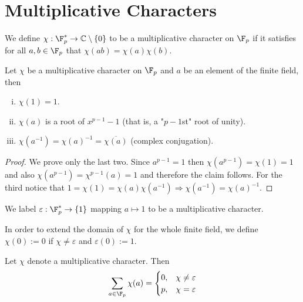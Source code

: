 \section{Multiplicative Characters}

\begin{definition}
   We define \(\chi : \F_p^{\ast} \to \mathbb{C} \setminus \{0\}\) to be a
   multiplicative character on \(\F_p\) if it satisfies for all \(a, b \in
   \F_p\) that \(\chi(ab) = \chi(a)\chi(b)\). 
\end{definition}

\begin{proposition}
   Let \(\chi\) be a multiplicative character on \(\F_p\) and \(a\) be an
   element of the finite field, then 
   \begin{enumerate}[i.]
      \item \(\chi(1) = 1\).
      \item  \(\chi(a)\) is a root of \(x^{p-1} - 1\) (that is, a "\(p-1\)st"
         root of unity).
      \item \(\chi(a^{-1}) = \chi(a)^{-1} = \overline{\chi(a)}\) (complex
         conjugation).
   \end{enumerate}
\end{proposition}

\begin{proof}
   We prove only the last two. Since \(a^{p-1} = 1\) then  \(\chi(a^{p-1}) =
   \chi(1) = 1\) and also  \(\chi(a^{p-1}) = \chi^{p-1}(a) = 1\) and therefore
   the claim follows.
   For the third notice that \(1 = \chi(1) = \chi(a)\chi(a^{-1}) \Rightarrow
   \chi(a^{-1}) = \chi(a)^{-1}\).
\end{proof}

\begin{definition}
   We label \(\varepsilon : \F_p^\ast \to \{1\}\) mapping \(a \mapsto 1\) to be
   a multiplicative character.
\end{definition}

In order to extend the domain of \(\chi\) for the whole finite field, we define
\(\chi(0) := 0\) if  \(\chi \neq  \varepsilon\) and \(\varepsilon(0) := 1\).

\begin{proposition}\label{prop: sum multiplicative characters}
   Let \(\chi\) denote a multiplicative character. Then
   \[
      \sum_{a \in \F_p} \chi(a) = 
      \begin{cases}
         0, &\chi \neq \varepsilon \\
         p, &\chi = \varepsilon
      \end{cases}
   \] 
\end{proposition}

